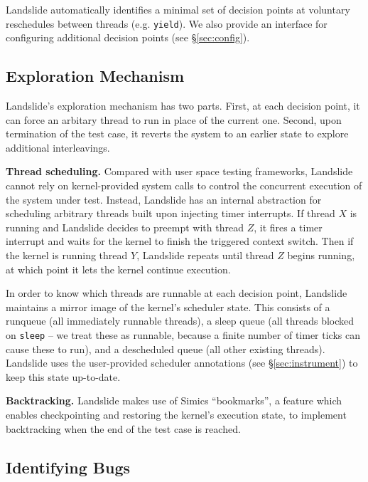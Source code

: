\documentclass{llncs}
\begin{document}
Landslide automatically identifies a minimal set of decision points at voluntary reschedules between threads (e.g. \texttt{yield}). We also provide an interface for configuring additional decision points (see \S\ref{sec:config}).

\subsection{Exploration Mechanism}

Landslide's exploration mechanism has two parts. First, at each decision point, it can force an arbitary thread to run in place of the current one. Second, upon termination of the test case, it reverts the system to an earlier state to explore additional interleavings.

{\bf Thread scheduling.} Compared with user space testing frameworks, Landslide cannot rely on kernel-provided system calls to control the concurrent execution of the system under test. Instead, Landslide has an internal abstraction for scheduling arbitrary threads built upon injecting timer interrupts.
If thread $X$ is running and Landslide decides to preempt with thread $Z$, it fires a timer interrupt and waits for the kernel to finish the triggered context switch. Then if the kernel is running thread $Y$, Landslide repeats until thread $Z$ begins running, at which point it lets the kernel continue execution.

In order to know which threads are runnable at each decision point, Landslide maintains a mirror image of the kernel's scheduler state. This consists of a runqueue (all immediately runnable threads), a sleep queue (all threads blocked on \texttt{sleep} -- we treat these as runnable, because a finite number of timer ticks can cause these to run), and a descheduled queue (all other existing threads).
Landslide uses the user-provided scheduler annotations (see \S\ref{sec:instrument}) to keep this state up-to-date.

{\bf Backtracking.} Landslide makes use of Simics ``bookmarks'', a feature
which enables checkpointing and restoring the kernel's execution state, to implement
backtracking when the end of the test case is reached.

\subsection{Identifying Bugs}

\end{document}
